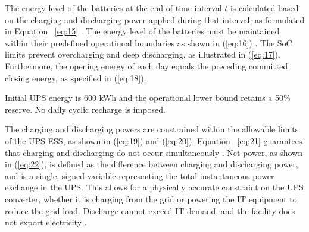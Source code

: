 \documentclass[lettersize,journal]{IEEEtran}
\providecommand{\DIFadd}[1]{{\color{blue}#1}}
\providecommand{\DIFaddbegin}{}
\providecommand{\DIFaddend}{}
\begin{document}
The energy level of the batteries at the end of time interval \(t\) is calculated based on the charging and discharging power applied during that interval, as formulated in Equation \DIFaddbegin \DIFadd{~\eqref{eq:15} }\DIFaddend \cite{Takci2024Chapter}.
The energy level of the batteries must be maintained within their predefined operational boundaries as shown in (\ref{eq:16}) \cite{Takci2024Chapter}. The SoC limits prevent overcharging and deep discharging, as illustrated in (\ref{eq:17}). Furthermore,  the  \DIFaddbegin \DIFadd{opening energy of each day equals the preceding committed closing energy}\DIFaddend , as specified in (\ref{eq:18}). \DIFaddbegin \DIFadd{Initial UPS energy is 600 kWh and the operational lower bound retains a 50\% reserve. No daily cyclic recharge is imposed.

}\DIFaddend 

The charging and discharging powers are constrained within the allowable limits of the UPS ESS, as shown in (\ref{eq:19}) and (\ref{eq:20}). Equation \DIFaddbegin \DIFadd{~\eqref{eq:21} }\DIFaddend guarantees that charging and discharging do not occur simultaneously \cite{Takci2024Chapter}. Net  \DIFaddbegin \DIFadd{power}\DIFaddend , as shown in (\ref{eq:22}), is defined as the difference between charging and discharging power, and is a single, signed variable representing the total instantaneous power exchange in the UPS. This allows for a physically accurate constraint on the UPS converter, whether it is charging from the grid  or powering the IT equipment to reduce the grid load. \DIFaddbegin \DIFadd{Discharge cannot exceed IT demand, and the facility does not export electricity }\DIFaddend \cite{Hashmi2024ArXiv}.
\end{document}
